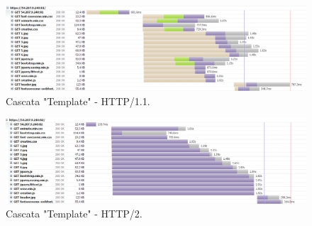 \begin{figure}[!htb]
    \centering
    \caption{Cascata "Template" - HTTP/1.1.}
    \includegraphics[width=1.0\textwidth]{./04-figuras/cascatas/template_http11}
\end{figure}

\begin{figure}[!htb]
    \centering
    \caption{Cascata "Template" - HTTP/2.}
    \includegraphics[width=1.0\textwidth]{./04-figuras/cascatas/template_http2}
\end{figure}
